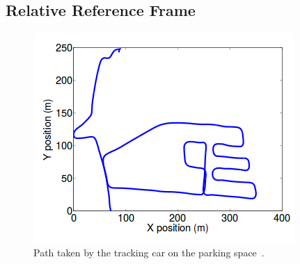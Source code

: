 \documentclass[twoside,a4paper,article]{combine}
\begin{document}
\subsection{Relative Reference Frame}
\label{sub:relative-ref-frame}
\begin{figure}
  \center
  \includegraphics[width=.45\linewidth]{rel-ref-frame-path}
  \caption{Path taken by the tracking car on the parking space~\cite{paper}.}
  \label{fig:rel-ref-frame-path}
\end{figure}
\end{document}
